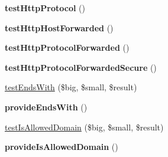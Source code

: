 \begin{DoxyCompactItemize}
\item 
\hypertarget{class_p_h_p_s_d_k_test_case_a78faa296262c84e95a67814a625d4e08}{{\bfseries test\-Http\-Protocol} ()}\label{class_p_h_p_s_d_k_test_case_a78faa296262c84e95a67814a625d4e08}

\item 
\hypertarget{class_p_h_p_s_d_k_test_case_a7d4559bf860ecfddc10468a1b715acbf}{{\bfseries test\-Http\-Host\-Forwarded} ()}\label{class_p_h_p_s_d_k_test_case_a7d4559bf860ecfddc10468a1b715acbf}

\item 
\hypertarget{class_p_h_p_s_d_k_test_case_ae6bac320d47f1e242e067c7c39a0518c}{{\bfseries test\-Http\-Protocol\-Forwarded} ()}\label{class_p_h_p_s_d_k_test_case_ae6bac320d47f1e242e067c7c39a0518c}

\item 
\hypertarget{class_p_h_p_s_d_k_test_case_a596e77a9e2fba9039cdb6906cdb43762}{{\bfseries test\-Http\-Protocol\-Forwarded\-Secure} ()}\label{class_p_h_p_s_d_k_test_case_a596e77a9e2fba9039cdb6906cdb43762}

\item 
\hyperlink{class_p_h_p_s_d_k_test_case_ae5f5200f1aa366979ee819abfa135b72}{test\-Ends\-With} (\$big, \$small, \$result)
\item 
\hypertarget{class_p_h_p_s_d_k_test_case_a218c9e538fda4717631f9dd841b3ffbb}{{\bfseries provide\-Ends\-With} ()}\label{class_p_h_p_s_d_k_test_case_a218c9e538fda4717631f9dd841b3ffbb}

\item 
\hyperlink{class_p_h_p_s_d_k_test_case_a14ec569ddc960fbdacc2eaa0f7e4b4af}{test\-Is\-Allowed\-Domain} (\$big, \$small, \$result)
\item 
\hypertarget{class_p_h_p_s_d_k_test_case_a6a8c9bc85a55f41d5e73db317e77a8e1}{{\bfseries provide\-Is\-Allowed\-Domain} ()}\label{class_p_h_p_s_d_k_test_case_a6a8c9bc85a55f41d5e73db317e77a8e1}

\end{DoxyCompactItemize}

